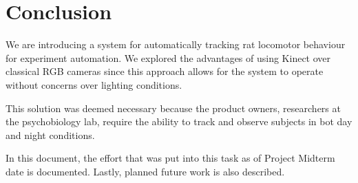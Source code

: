 \chapter{Conclusion}
We are introducing a system for automatically tracking rat locomotor behaviour for experiment automation. We explored the advantages of using Kinect over classical RGB cameras since this approach allows for the system to operate without concerns over lighting conditions. 

This solution was deemed necessary because the product owners, researchers at the psychobiology lab, require the ability to track and observe subjects in bot day and night conditions.

In this document, the effort that was put into this task as of Project Midterm date is documented. Lastly, planned future work is also described.
